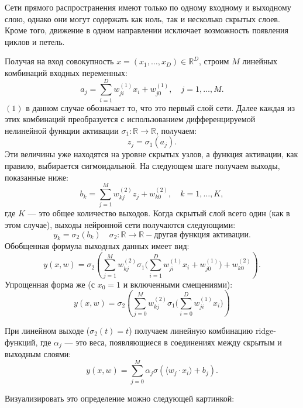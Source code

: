 \documentclass[../NDCNNAI_main.tex]{subfiles}
\begin{document}
\begin{remark}
	Сети прямого распространения имеют только по одному входному и выходному слою, однако они могут содержать как ноль, так и несколько скрытых слоев.
	Кроме того, движение в одном направлении исключает возможность появления циклов и петель. 
\end{remark}

\begin{definition}
	Получая на вход совокупность $x = (x_1,\dots,x_D) \in  \mathbb{R}^D$, строим $M$ линейных комбинаций входных переменных:
	$$a_j = \sum_{i=1}^{D}w_{ji}^{(1)}x_i + w_{j0}^{(1)}, \quad j = 1,\dots,M.$$ 
	$(1)$ в данном случае обозначает то, что это первый слой сети.
	Далее каждая из этих комбинаций преобразуется с использованием дифференцируемой нелинейной функции активации $\sigma_1\colon \mathbb{R} \to \mathbb{R}$, получаем:
	$$z_j = \sigma_1(a_j).$$
	Эти величины уже находятся на уровне скрытых узлов, а функция активации, как правило, выбирается сигмоидальной.
	На следующем шаге получаем выходы, показанные ниже:
	$$b_k = \sum_{j=1}^{M}w_{kj}^{(2)}z_j + w_{k0}^{(2)}, \quad k = 1,\dots,K,$$ 
	где $K$ --- это общее количество выходов.
	Когда скрытый слой всего один (как в этом случае), выходы нейронной сети получаются следующими:
	$$y_k = \sigma_2(b_k) \quad \sigma_2\colon \mathbb{R} \to \mathbb{R} - \text{другая функция активации.}$$
	Обобщенная формула выходных данных имеет вид:
	$$y(x,w) = \sigma_2 \left( \sum_{j=1}^{M}w_{kj}^{(2)}\sigma_1\biggl(\sum_{i=1}^{D}w_{ji}^{(1)}x_i + w_{j0}^{(1)}\biggr) + w_{k0}^{(2)} \right).$$
	Упрощенная форма же (с $x_0 = 1$ и включенными смещениями):
	$$y(x,w) = \sigma_2 \left( \sum_{j=0}^{M}w_{kj}^{(2)}\sigma_1\biggl(\sum_{i=0}^{D}w_{ji}^{(1)}x_i\biggr) \right) $$

	При линейном выходе ($\sigma_2(t) = t$) получаем линейную комбинацию ridge-функций, где $\alpha_j$ --- это веса, появляющиеся в соединениях между скрытым и выходным слоями: 
	$$y(x,w) = \sum_{j=0}^{M}\alpha_j\sigma\left( \langle w_{j} \cdot x_i \rangle + b_j \right).$$
\end{definition}
Визуализировать это определение можно следующей картинкой:
\end{document}
